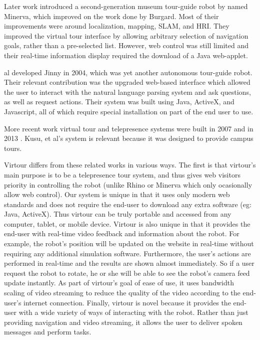 \documentclass[
  oneside,
  11pt, a4paper,
  footinclude=true,
  headinclude=true,
  cleardoublepage=empty
]{article}
\begin{document}
Later work introduced a second-generation museum tour-guide robot by
\cite{thrun1999} named Minerva, which improved on the work done by Burgard.
Most of their improvements were around localization, mapping, SLAM, and HRI.
They improved the virtual tour interface by allowing arbitrary selection of
navigation goals, rather than a pre-selected list. However, web control was
still limited and their real-time information display required the download of
a Java web-applet.

\cite{kim2004} al developed Jinny in 2004, which was yet another autonomous
tour-guide robot. Their relevant contribution was the upgraded web-based
interface which allowed the user to interact with the natural language parsing
system and ask questions, as well as request actions. Their system was built
using Java, ActiveX, and Javascript, all of which require special installation
on part of the end user to use.

More recent work virtual tour and telepresence systems were built in 2007
\cite{michaud2007} and in 2013 \cite{kusu2013}. Kusu, et al's system is relevant
because it was designed to provide campus tours.

Virtour differs from these related works in various ways. The first is that
virtour's main purpose is to be a telepresence tour system, and thus gives web
visitors priority in controlling the robot (unlike Rhino or Minerva which only
ocasionally allow web control). Our system is unique in that it uses
only modern web standards and does not require the end-user to download any
extra software (eg: Java, ActiveX). Thus virtour can be truly portable and
accessed from any computer, tablet, or mobile device. Virtour is also
unique in that it provides the end-user with real-time video feedback and
information about the robot. For example, the robot's position will be updated
on the website in real-time without requiring any additional simulation
software. Furthermore, the user's actions are performed in real-time and the
results are shown almost immediately. So if a user request the robot to rotate,
he or she will be able to see the robot's camera feed update instantly.  As
part of virtour's goal of ease of use, it uses bandwidth scaling of video
streaming to reduce the quality of the video according to the end-user's
internet connection. Finally, virtour is novel because it provides the end-user
with a wide variety of ways of interacting with the robot. Rather than just
providing navigation and video streaming, it allows the user to deliver spoken
messages and perform tasks.
\end{document}
